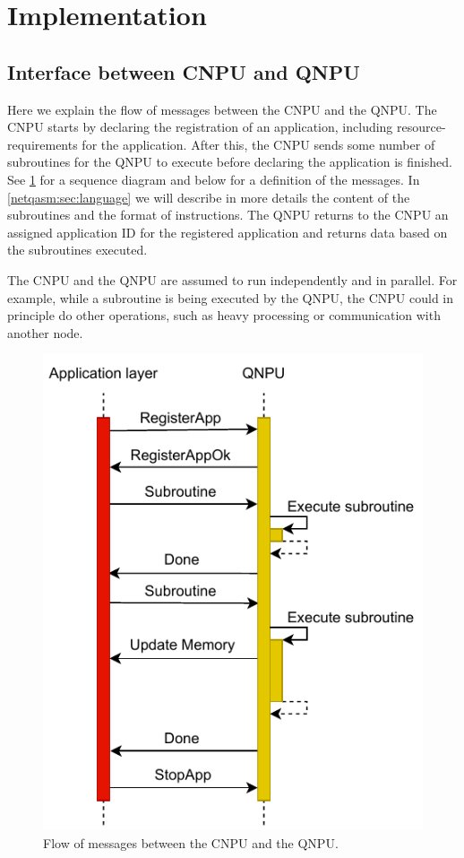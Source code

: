 \section{Implementation}
\label{netqasm:sec:implementation}

\subsection{Interface between \ac{CNPU} and \ac{QNPU}}
Here we explain the flow of messages between the \ac{CNPU} and the \ac{QNPU}.
The \ac{CNPU} starts by declaring the registration of an application, including resource-requirements for the application.
After this, the \ac{CNPU} sends some number of subroutines for the \ac{QNPU} to execute before declaring the application is finished.
See \cref{fig:message_sequence} for a sequence diagram and below for a definition of the messages.
In \cref{netqasm:sec:language} we will describe in more details the content of the subroutines and the format of instructions.
The \ac{QNPU} returns to the \ac{CNPU} an assigned application ID for the registered application and returns data based on the subroutines executed.

The \ac{CNPU} and the \ac{QNPU} are assumed to run independently and in parallel.
For example, while a subroutine is being executed by the \ac{QNPU}, the \ac{CNPU} could in principle do other operations, such as heavy processing or communication with another node.

\begin{figure}
      \centering
      \includegraphics[width=0.5\linewidth]{figures/netqasm/message-flow.pdf}
      \caption{Flow of messages between the \ac{CNPU} and the \ac{QNPU}.}
      \label{fig:message_sequence}
\end{figure}

